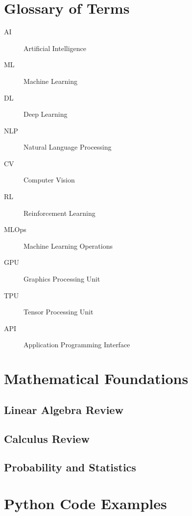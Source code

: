 
\chapter{Glossary of Terms}
\label{app:glossary}


\begin{description}
    \item[AI] Artificial Intelligence
    \item[ML] Machine Learning
    \item[DL] Deep Learning
    \item[NLP] Natural Language Processing
    \item[CV] Computer Vision
    \item[RL] Reinforcement Learning
    \item[MLOps] Machine Learning Operations
    \item[GPU] Graphics Processing Unit
    \item[TPU] Tensor Processing Unit
    \item[API] Application Programming Interface
\end{description}

\chapter{Mathematical Foundations}
\label{app:math}

\section{Linear Algebra Review}


\section{Calculus Review}


\section{Probability and Statistics}


\chapter{Python Code Examples}
\label{app:code}


